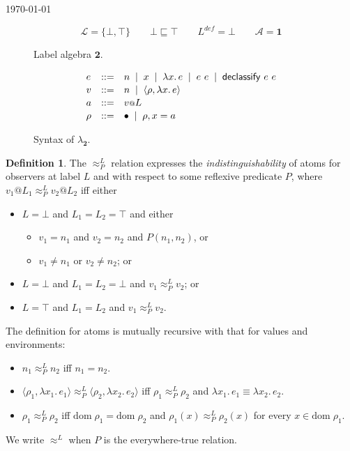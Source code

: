 \documentclass{article}
\makeatletter
\newcommand{\at}{\ensuremath{{\scriptstyle{@}}}}
\theoremstyle{definition}
\newtheorem{definition}{Definition}
\makeatother
\begin{document}
\begin{flushright}
  \today
\end{flushright}

\begin{figure}[h]
  \centering
  \[
  \mathcal{L} = \{ \bot, \top \}
  \qquad
  \bot \sqsubseteq \top
  \qquad
  L^{\mathit{def}} = \bot
  \qquad
  \mathcal{A} = \mathbf{1}
  \]
  \caption{Label algebra $\mathbf{2}$.}
  \label{fig:two}
\end{figure}

\begin{figure}[h]
  \centering
  \[
  \begin{array}[t]{lcl}
    e & ::= &
    n\;\; |\;\;
    x\;\; |\;\;
    \lambda{x}.\, e\;\; |\;\;
    e\ e\;\; |\;\;
    \mathsf{declassify}\ e\ e
    \\[0.3ex]
    v & ::= &
    n\;\; |\;\;
    \langle{\rho, \lambda{x}.\, e\rangle}
    \\[0.3ex]
    a & ::= &
    v \at L
    \\[0.3ex]
    \rho & ::= &
    \bullet\;\; |\;\;
    \rho, x = a
  \end{array}
  \]
  \caption{Syntax of $\lambda_{\mathbf{2}}$.}
  \label{fig:syntax}
\end{figure}

\begin{definition}
  The $\approx^{L}_{P}$ relation expresses the \emph{indistinguishability} of
  atoms for observers at label $L$ and with respect to some reflexive predicate
  $P$, where $v_1 \at L_1 \approx^{L}_{P} v_2 \at L_2$ iff either
  \begin{itemize}
  \item $L = \bot$ and
    $L_1 = L_2 = \top$ and either
    \begin{itemize}
    \item $v_1 = n_1$ and
      $v_2 = n_2$ and
      $P(n_1, n_2)$, or
    \item $v_1 \not= n_1$ or $v_2 \not= n_2$; or
    \end{itemize}
  \item $L = \bot$ and
    $L_1 = L_2 = \bot$ and $v_1 \approx^{L}_{P} v_2$; or
  \item $L = \top$ and $L_1 = L_2$ and $v_1 \approx^{L}_{P} v_2$.
  \end{itemize}
  The definition for atoms is mutually recursive with that for values and
  environments:
  \begin{itemize}
  \item $n_1 \approx^{L}_{P} n_2$ iff $n_1 = n_2$.
  \item
    $\langle{\rho_1, \lambda{x_1}.\, e_1\rangle} \approx^{L}_{P}
    \langle{\rho_2, \lambda{x_2}.\, e_2\rangle}$ iff
    $\rho_1 \approx^{L}_{P} \rho_2$ and
    $\lambda{x_1}.\, e_1 \equiv \lambda{x_2}.\, e_2$.
  \item $\rho_1 \approx^{L}_{P} \rho_2$ iff
    $\mathrm{dom}\; \rho_1 = \mathrm{dom}\; \rho_2$ and
    $\rho_1(x) \approx^{L}_{P} \rho_2(x)$ for every
    $x \in \mathrm{dom}\; \rho_1$.
  \end{itemize}
  We write $\approx^{L}$ when $P$ is the everywhere-true relation.
  \label{def:lp-equiv}
\end{definition}
\end{document}
